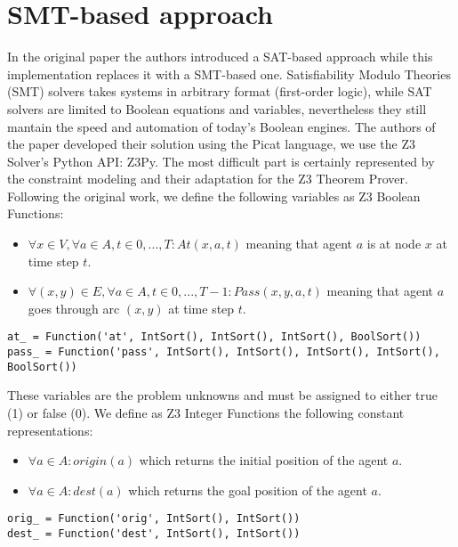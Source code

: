 \documentclass[12pt, a4paper, hidelinks]{article}
\numberwithin{equation}{section}
\begin{document}
\section{SMT-based approach}\label{sec:smt-based-approach}
In the original paper the authors introduced a SAT-based approach while this implementation replaces it with a SMT-based one. 
Satisfiability Modulo Theories (SMT) solvers takes systems in arbitrary format (first-order logic), while SAT solvers are limited to Boolean equations and variables, nevertheless they still mantain the speed and automation of today's Boolean engines.
The authors of the paper developed their solution using the Picat language, we use the Z3 Solver's Python API: Z3Py.
The most difficult part is certainly represented by the constraint modeling and their adaptation for the Z3 Theorem Prover.
Following the original work, we define the following variables as Z3 Boolean Functions:

\begin{itemize}
\item $\forall x \in V, \forall a \in A, t \in {0, ..., T} : At(x, a, t)$ meaning that agent $a$ is at node $x$ at time step $t$.
\item $\forall(x, y)\in E, \forall a \in A, t \in {0, ..., T-1} : Pass(x, y, a, t)$ meaning that agent $a$ goes through arc $(x, y)$ at time step $t$. 
\end{itemize}

\begin{lstlisting}
at_ = Function('at', IntSort(), IntSort(), IntSort(), BoolSort())
pass_ = Function('pass', IntSort(), IntSort(), IntSort(), IntSort(), BoolSort())
\end{lstlisting}

These variables are the problem unknowns and must be assigned to either true (1) or false (0). We define as Z3 Integer Functions the following constant representations:

\begin{itemize}
\item $\forall a \in A : origin(a)$ which returns the initial position of the agent $a$.
\item $\forall a \in A : dest(a)$ which returns the goal position of the agent $a$.
\end{itemize}

\begin{lstlisting}
orig_ = Function('orig', IntSort(), IntSort())
dest_ = Function('dest', IntSort(), IntSort())
\end{lstlisting}
\end{document}
